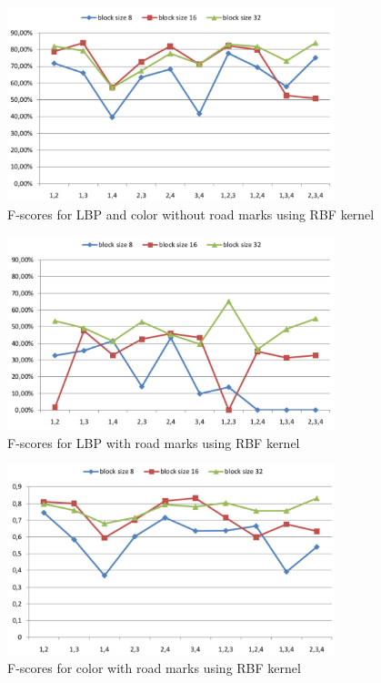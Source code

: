 \documentclass[runningheads,a4paper]{llncs}
\begin{document}
\begin{figure}
\centering
\includegraphics[width=0.85\textwidth]{fig/RBF-LBP-COL-wi-RM.pdf}
\caption{F-scores for LBP and color without road marks using RBF kernel}
\end{figure}

\begin{figure}
\centering
\includegraphics[width=0.85\textwidth]{fig/RBF-LBP-wi-RM.pdf}
\caption{F-scores for LBP with road marks using RBF kernel}
\end{figure}

\begin{figure}
\centering
\includegraphics[width=0.85\textwidth]{fig/RBF-COL-wi-RM.pdf}
\caption{F-scores for color with road marks using RBF kernel}
\end{figure}
\end{document}
